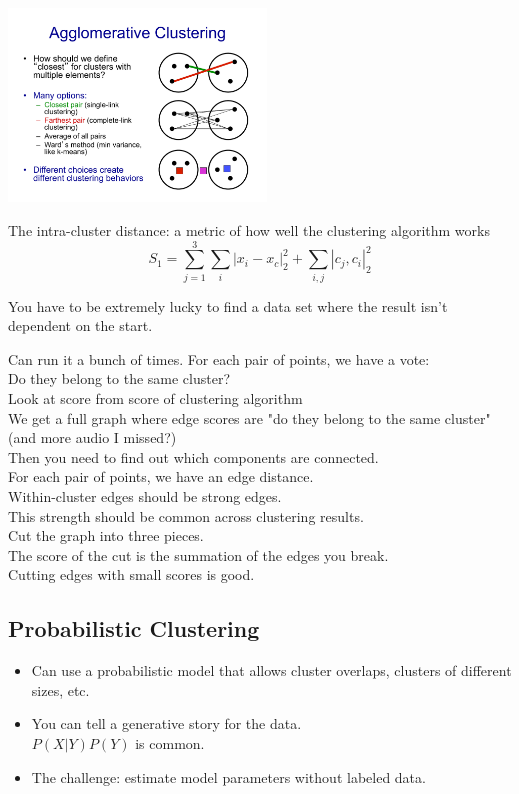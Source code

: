 \includegraphics[width=2.7in]{figures/agglomerative_clustering_distance_options.pdf}

The intra-cluster distance: a metric of how well the clustering algorithm works
$$ S_1 = \sum_{j=1}^3 \sum_i |x_i - x_c|_2^2 + \sum_{i,j} |c_j, c_i|_2^2 $$ %

You have to be extremely lucky to find a data set where the result isn't dependent on the start.

Can run it a bunch of times. %
For each pair of points, we have a vote:  \hfill \\
Do they belong to the same cluster? \hfill \\
Look at score from score of clustering algorithm \hfill \\
We get a full graph where edge scores are "do they belong to the same 					cluster"  (and more audio I missed?) \hfill \\
Then you need to find out which components are connected.  \hfill \\

For each pair of points, we have an edge distance.  \hfill \\
Within-cluster edges should be strong edges.    \hfill \\
This strength should be common across clustering results.  \hfill \\
Cut the graph into three pieces.    \hfill \\
The score of the cut is the summation of the edges you break.   \hfill \\
Cutting edges with small scores is good.   \hfill \\


\subsection{Probabilistic Clustering}
\begin{itemize}
	\item Can use a probabilistic model that allows cluster overlaps, clusters of different sizes, etc.
	\item You can tell a generative story for the data.  \hfill \\
		$P(X|Y) P(Y)$ is common. 
	\item The challenge: estimate model parameters without labeled data. 
\end{itemize}

